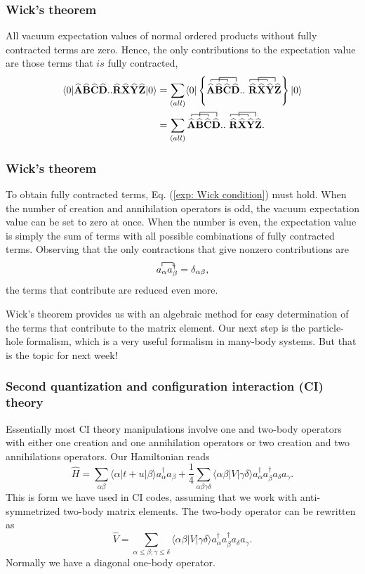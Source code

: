 \documentclass[compress]{beamer}
\newcommand*{\cre}[1]{a^{\dagger}_{#1}}
\newcommand*{\an}[1]{a_{#1}}
\newcommand*{\for}[3]{\langle#1|#2|#3\rangle}
\newcommand*{\kpr}[1]{\left\{#1\right\}}
\newcommand*{\ket}[1]{|#1\rangle}
\newcommand*{\bra}[1]{\langle#1|}
\newcommand{\OP}[1]{{\bf\widehat{#1}}}
\newcommand*{\pr}[1]{\left(#1\right)}
\newcommand{\element}[3]
        {\bra{#1}#2\ket{#3}}
\begin{document}
\frame
{
  \frametitle{Wick's theorem}
\begin{small}
{\scriptsize
All vacuum expectation values of normal ordered products without fully contracted terms are zero. Hence, the only contributions to the expectation value are those terms that $\textit{is}$ fully contracted,
\begin{align}
\for{0}{\OP{A}\OP{B}\OP{C}\OP{D}..\OP{R}\OP{X}\OP{Y}\OP{Z}}{0} &= \sum_{\pr{all}} \for{0}{\kpr{\contraction[0.5ex]{}{\OP{A}}{\OP{B}}{\OP{C}}\contraction[1.0ex]{\OP{A}}{\OP{B}}{\OP{C}}{\OP{D}} \OP{A}\OP{B}\OP{C}\OP{D}..\contraction[0.5ex]{}{\OP{R}}{\OP{X}}{\OP{Y}}\contraction[1.0ex]{\OP{R}}{\OP{X}}{\OP{Y}}{\OP{Z}}\ \OP{R}\OP{X}\OP{Y}\OP{Z}}}{0}\\
&= \sum_{\pr{all}} \contraction[0.5ex]{}{\OP{A}}{\OP{B}}{\OP{C}}\contraction[1.0ex]{\OP{A}}{\OP{B}}{\OP{C}}{\OP{D}} \OP{A}\OP{B}\OP{C}\OP{D}..\contraction[0.5ex]{}{\OP{R}}{\OP{X}}{\OP{Y}}\contraction[1.0ex]{\OP{R}}{\OP{X}}{\OP{Y}}{\OP{Z}}\ \OP{R}\OP{X}\OP{Y}\OP{Z}.
\end{align}
}
\end{small}
}

\frame
{
  \frametitle{Wick's theorem}
\begin{small}
{\scriptsize
To obtain fully contracted terms, Eq. (\ref{exp: Wick condition}) must hold. When the number of creation and annihilation operators is odd, the vacuum expectation value can be set to zero at once. When the number is even, the expectation value is simply the sum of terms with all possible combinations of fully contracted terms. Observing that the only contractions that give nonzero contributions are 
\begin{align}
\contraction{}{\an{\alpha}}{}{\cre{\beta}}
\an{\alpha}\cre{\beta} = \delta_{\alpha \beta},
\end{align}
the terms that contribute are reduced even more.

Wick's theorem provides us with an algebraic method for easy determination of the terms that contribute to the matrix element. Our next step is the particle-hole formalism, which is a very useful formalism in many-body systems. But that is the topic for next week!
}
\end{small}
}

\frame
{
  \frametitle{Second quantization and configuration interaction (CI) theory}
\begin{small}
{\scriptsize
Essentially most CI theory manipulations involve one and two-body operators
with either one creation and one annihilation operators or two creation and two annihilations
operators. Our Hamiltonian reads
\[
        \hat{H} = \sum_{\alpha\beta} \element{\alpha}{t+u}{\beta} a_\alpha^\dagger a_\beta + \frac{1}{4} \sum_{\alpha\beta\gamma\delta}
                \element{\alpha \beta}{V}{\gamma \delta} a_\alpha^\dagger a_\beta^\dagger a_\delta a_\gamma. \]
This is form we have used in CI codes, assuming that we work with anti-symmetrized two-body matrix elements.
The two-body operator can be rewritten as
\[
        \hat{V} =\sum_{\alpha\le\beta;\gamma\le\delta}
                \element{\alpha \beta}{V}{\gamma \delta} a_\alpha^\dagger a_\beta^\dagger a_\delta a_\gamma. \]
Normally we have a diagonal one-body operator.
}
\end{small}
}
\end{document}
